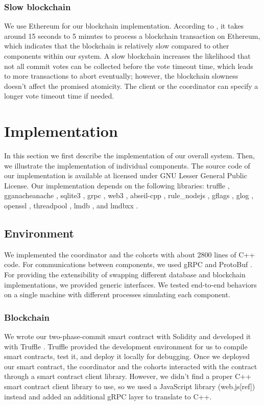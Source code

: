 \documentclass[11pt,sigplan,screen,nonacm]{acmart}
\begin{document}
\subsubsection{Slow blockchain}
We use Ethereum for our blockchain implementation. According to \cite{stationlong}, it takes around 15 seconds to 5 minutes to process a blockchain transaction on Ethereum, which indicates that the blockchain is relatively slow compared to other components within our system. A slow blockchain increases the likelihood that not all commit votes can be collected before the vote timeout time, which leads to more transactions to abort eventually; however, the blockchain slowness doesn’t affect the promised atomicity. The client or the coordinator can specify a longer vote timeout time if needed.

\section{Implementation}
In this section we first describe the implementation of our overall system. Then, we illustrate the implementation of individual components. The source code of our implementation is available at licensed under GNU Lesser General Public License. Our implementation depends on the following libraries: truffle \cite{github_truffle}, gganacheanache \cite{github_ganache}, sqlite3 \cite{github_sqlite3}, grpc \cite{github_grpc}, web3 \cite{github_web3}, abseil-cpp \cite{github_absl}, rule\_nodejs \cite{github_rulejs}, gflags \cite{github_gflags}, glog \cite{github_glog}, openssl \cite{github_openssl}, threadpool \cite{Shoshany2021_ThreadPool}, lmdb \cite{github_lmdb}, and lmdbxx \cite{github_lmdbxx}.

\subsection{Environment}
We implemented the coordinator and the cohorts with about 2800 lines of C++ code. For communications between components, we used gRPC \cite{github_grpc} and ProtoBuf \cite{github_proto}. For providing the extensibility of swapping different database and blockchain implementations, we provided generic interfaces. We tested end-to-end behaviors on a single machine with different processes simulating each component.

\subsubsection{Blockchain}
We wrote our two-phase-commit smart contract with Solidity and developed it with Truffle \cite{github_truffle}. Truffle provided the development environment for us to compile smart contracts, test it, and deploy it locally for debugging. Once we deployed our smart contract, the coordinator and the cohorts interacted with the contract through a smart contract client library. However, we didn’t find a proper C++ smart contract client library to use, so we used a JavaScript library (web.js[ref]) instead and added an additional gRPC layer to translate to C++.
\end{document}
